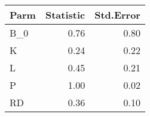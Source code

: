\begin{tabular}{lrr}
  \hline
Parm & Statistic & Std.Error \\ 
  \hline
B\_0 & 0.76 & 0.80 \\ 
  K & 0.24 & 0.22 \\ 
  L & 0.45 & 0.21 \\ 
  P & 1.00 & 0.02 \\ 
  RD & 0.36 & 0.10 \\ 
   \hline
\end{tabular}
